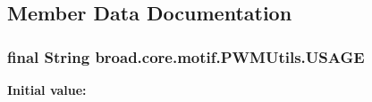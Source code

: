 \subsection{Member Data Documentation}
\hypertarget{classbroad_1_1core_1_1motif_1_1_p_w_m_utils_aff73c275f71b26881df0ee1d11924665}{
\subsubsection[{U\+S\+A\+G\+E}]{\setlength{\rightskip}{0pt plus 5cm}final String broad.\+core.\+motif.\+P\+W\+M\+Utils.\+U\+S\+A\+G\+E\hspace{0.3cm}{\ttfamily [static]}}}\label{classbroad_1_1core_1_1motif_1_1_p_w_m_utils_aff73c275f71b26881df0ee1d11924665}
{\bfseries Initial value\+:}
